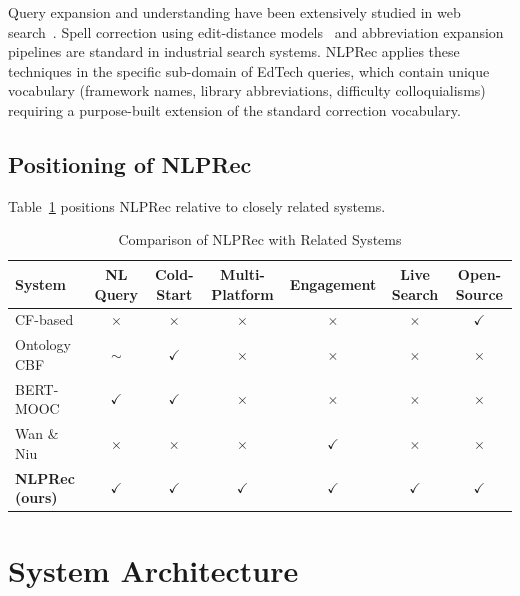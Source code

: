 \documentclass[12pt, a4paper]{article}
\begin{document}
Query expansion and understanding have been extensively studied in web search~\cite{lavrenko2001relevance}.
Spell correction using edit-distance models~\cite{norvig2007natural} and abbreviation expansion
pipelines are standard in industrial search systems. NLPRec applies these techniques in the
specific sub-domain of EdTech queries, which contain unique vocabulary (framework names, library
abbreviations, difficulty colloquialisms) requiring a purpose-built extension of the standard
correction vocabulary.

\subsection{Positioning of NLPRec}

Table~\ref{tab:related_comparison} positions NLPRec relative to closely related systems.

\begin{table}[htbp]
\centering
\caption{Comparison of NLPRec with Related Systems}
\label{tab:related_comparison}
\renewcommand{\arraystretch}{1.3}
\begin{tabular}{lcccccc}
\toprule
\textbf{System} & \textbf{NL Query} & \textbf{Cold-Start} & \textbf{Multi-Platform}
                & \textbf{Engagement} & \textbf{Live Search} & \textbf{Open-Source} \\
\midrule
CF-based \cite{sarwar2001item}    & $\times$ & $\times$ & $\times$ & $\times$ & $\times$ & $\checkmark$ \\
Ontology CBF \cite{tarus2018knowledge} & $\sim$ & $\checkmark$ & $\times$ & $\times$ & $\times$ & $\times$ \\
BERT-MOOC \cite{deng2020mooc}     & $\checkmark$ & $\checkmark$ & $\times$ & $\times$ & $\times$ & $\times$ \\
Wan \& Niu \cite{wan2018mooc}     & $\times$ & $\times$ & $\times$ & $\checkmark$ & $\times$ & $\times$ \\
\textbf{NLPRec (ours)}            & $\checkmark$ & $\checkmark$ & $\checkmark$ & $\checkmark$ & $\checkmark$ & $\checkmark$ \\
\bottomrule
\end{tabular}
\end{table}

\section{System Architecture}
\label{sec:system_architecture}
\end{document}
